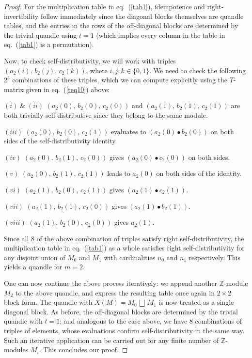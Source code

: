 \documentclass[a4paper,12pt]{article}
\newcommand{\Z}{\mathbb{Z}}
\begin{document}
\begin{proof}
For the multiplication table in eq.~(\ref{tab1}), idempotence and right-invertibility follow immediately since the diagonal blocks themselves are quandle tables, and the  entries in the rows of the off-diagonal blocks are determined by the trivial quandle using $t = 1$ (which implies every column in the table in eq.~(\ref{tab1}) is a permutation).   

Now, to check self-distributivity, we will work with triples $\left( a_2 (i), \, b_2 (j), \, c_2 (k) \right)$, where $i, j, k \in \{0, 1\}$.  We need to check the following $2^3$ combinations of these triples, which we can compute explicitly using the $T$-matrix given in eq.~(\ref{teq10}) above:       

$(i) \; \& \; (ii)$  $(a_2(0), \, b_2(0), \, c_2(0))$ and $(a_2(1), \, b_2(1), \, c_2(1))$ are both trivially self-distributive since they belong to the same module.
    
$(iii)$    $(a_2(0), \, b_2(0), \, c_2(1))$ evaluates to $( a_2(0) \bullet b_2(0) )$ on both sides of the self-distributivity identity.  
   
$(iv)$   $(a_2(0), \, b_2(1), \, c_2(0))$ gives $( a_2(0) \bullet c_2(0) )$ on both sides.
   
$(v)$    $(a_2(0), \, b_2(1), \, c_2(1))$ leads to $a_2(0)$ on both sides of the identity.

$(vi)$   $(a_2(1), \, b_2(0), \, c_2(1))$ gives $( a_2(1) \bullet c_2(1) )$.

$(vii)$   $(a_2(1), \, b_2(1), \, c_2(0))$ gives $( a_2(1) \bullet b_2(1) )$.

$(viii)$  $(a_2(1), \, b_2(0), \, c_2(0))$ gives $a_2(1)$.

Since all 8 of the above combination of triples satisfy right self-distributivity, the multiplication table in eq.~(\ref{tab1}) as a whole satisfies right self-distributivity for any disjoint union of $M_0$ and $M_1$ with cardinalities $n_0$ and $n_1$ respectively. This yields a quandle for $m = 2$.   

One can now continue the above process iteratively: we append another $\Z$-module $M_2$ to the above quandle, and express the resulting table once again in $2 \times 2$ block form. The quandle with $X(M) = M_0 \, \bigsqcup \,  M_1$ is now treated as a single diagonal block.  As before, the off-diagonal blocks are determined by the trivial quandle with $t = 1$; and analogous to the case above, we have 8 combinations of triples of elements, whose evaluations confirm self-distributivity in the same way. Such an iterative application can be carried out for any finite number of $\Z$-modules $M_i$. This concludes our proof.   
\end{proof}
\end{document}
